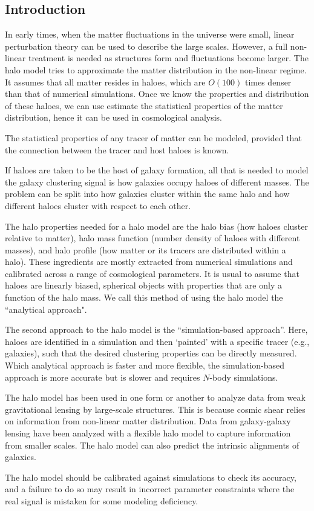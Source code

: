 

\subsection{Introduction}

In early times, when the matter fluctuations in the universe were small, linear perturbation theory can be used to describe the large scales. However, a full non-linear treatment is needed as structures form and fluctuations become larger. The halo model tries to approximate the matter distribution in the non-linear regime. It assumes that all matter resides in haloes, which are $O(100)$ times denser than that of numerical simulations. Once we know the properties and distribution of these haloes, we can use estimate the statistical properties of the matter distribution, hence it can be used in cosmological analysis. 

The statistical properties of any tracer of matter can be modeled, provided that the connection between the tracer and host haloes is known. 

\begin{principle}
If haloes are taken to be the host of galaxy formation, all that is needed to model the galaxy clustering signal is how galaxies occupy haloes of different masses. The problem can be split into how galaxies cluster within the same halo and how different haloes cluster with respect to each other.
\end{principle}

The halo properties needed for a halo model are the halo bias (how haloes cluster relative to matter), halo mass function (number density of haloes with different masses), and halo profile (how matter or its tracers are distributed within a halo). These ingredients are mostly extracted from numerical simulations and calibrated across a range of cosmological parameters. It is usual to assume that haloes are linearly biased, spherical objects with properties that are only a function of the halo mass. We call this method of using the halo model the ``analytical approach".

The second approach to the halo model is the ``simulation-based approach''. Here, haloes are identified in a simulation and then `painted' with a specific tracer (e.g., galaxies), such that the desired clustering properties can be directly measured. Which analytical approach is faster and more flexible, the simulation-based approach is more accurate but is slower and requires $N$-body simulations.

The halo model has been used in one form or another to analyze data from weak gravitational lensing by large-scale structures. This is because cosmic shear relies on information from non-linear matter distribution. Data from galaxy-galaxy lensing have been analyzed with a flexible halo model to capture information from smaller scales. The halo model can also predict the intrinsic alignments of galaxies. 

The halo model should be calibrated against simulations to check its accuracy, and a failure to do so may result in incorrect parameter constraints where the real signal is mistaken for some modeling deficiency. 